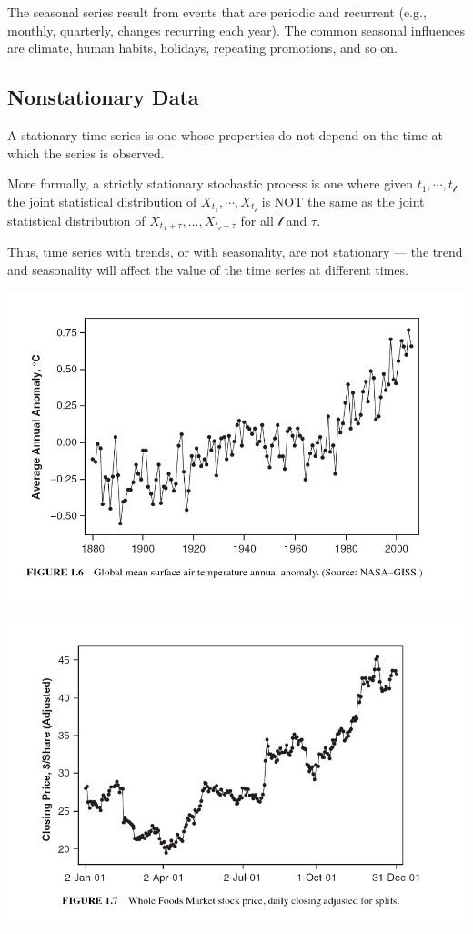 \documentclass[
]{book}
\begin{document}
The seasonal series result from events that are periodic and recurrent (e.g., monthly, quarterly, changes recurring each year). The common seasonal influences are climate, human habits, holidays, repeating promotions, and so on.

\hypertarget{nonstationary-data}{%
\subsection{Nonstationary Data}\label{nonstationary-data}}

A stationary time series is one whose properties do not depend on the time at which the series is observed.

More formally, a strictly stationary stochastic process is one where given \(t_1, \cdots, t_{\mathcal{l}}\) the joint statistical distribution of \(X_{t_1} , \cdots ,X_{t_{\mathcal{l}}}\) is NOT the same as the joint statistical distribution of \(X_{t_1 + \tau} , . . . ,X_{t_{\mathcal{l}}+\tau}\) for all \(\mathcal{l}\) and \(\tau\).

Thus, time series with trends, or with seasonality, are not stationary --- the trend and seasonality will affect the value of the time series at different times.

\begin{center}\includegraphics[width=0.8\linewidth]{img11/w11-Figure06} \end{center}

\begin{center}\includegraphics[width=0.8\linewidth]{img11/w11-Figure07} \end{center}
\end{document}
